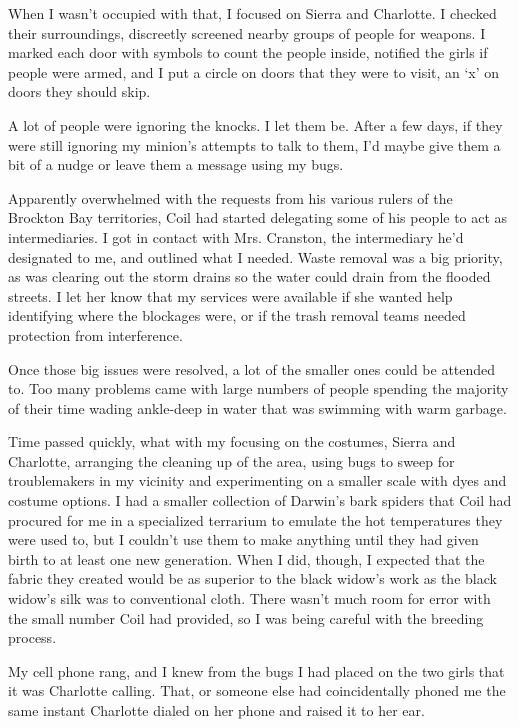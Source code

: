 When I wasn't occupied with that, I focused on Sierra and Charlotte.  I checked their surroundings, discreetly screened nearby groups of people for weapons.  I marked each door with symbols to count the people inside, notified the girls if people were armed, and I put a circle on doors that they were to visit, an `x' on doors they should skip.



A lot of people were ignoring the knocks.  I let them be.  After a few days, if they were still ignoring my minion's attempts to talk to them, I'd maybe give them a bit of a nudge or leave them a message using my bugs.



Apparently overwhelmed with the requests from his various rulers of the Brockton Bay territories, Coil had started delegating some of his people to act as intermediaries.  I got in contact with Mrs. Cranston, the intermediary he'd designated to me, and outlined what I needed.  Waste removal was a big priority, as was clearing out the storm drains so the water could drain from the flooded streets.  I let her know that my services were available if she wanted help identifying where the blockages were, or if the trash removal teams needed protection from interference.



Once those big issues were resolved, a lot of the smaller ones could be attended to.  Too many problems came with large numbers of people spending the majority of their time wading ankle-deep in water that was swimming with warm garbage.



Time passed quickly, what with my focusing on the costumes, Sierra and Charlotte, arranging the cleaning up of the area, using bugs to sweep for troublemakers in my vicinity and experimenting on a smaller scale with dyes and costume options.  I had a smaller collection of Darwin's bark spiders that Coil had procured for me in a specialized terrarium to emulate the hot temperatures they were used to, but I couldn't use them to make anything until they had given birth to at least one new generation.  When I did, though, I expected that the fabric they created would be as superior to the black widow's work as the black widow's silk was to conventional cloth.  There wasn't much room for error with the small number Coil had provided, so I was being careful with the breeding process.



My cell phone rang, and I knew from the bugs I had placed on the two girls that it was Charlotte calling.  That, or someone else had coincidentally phoned me the same instant Charlotte dialed on her phone and raised it to her ear.



